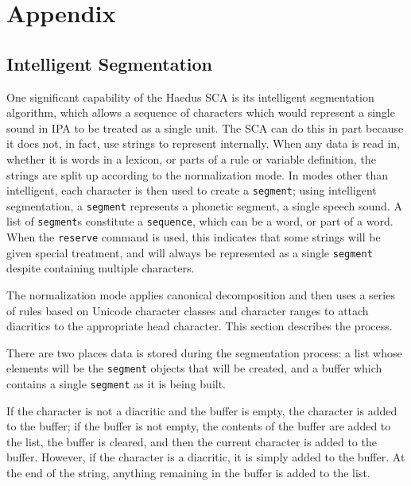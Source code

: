 \documentclass[10pt,letterpaper]{article}
\begin{document}

\section{Appendix}
\label{sec:appendix}

\subsection{Intelligent Segmentation}
\label{sub:segmentation}
One significant capability of the Haedus SCA is its intelligent segmentation algorithm, which allows a sequence of characters which would represent a single sound in IPA to be treated as a single unit. The SCA can do this in part because it does not, in fact, use strings to represent internally. When any data is read in, whether it is words in a lexicon, or parts of a rule or variable definition, the strings are split up according to the normalization mode. In modes other than intelligent, each character is then used to create a \texttt{segment}; using intelligent segmentation, a \texttt{segment} represents a phonetic segment, a single speech sound. A list of \texttt{segment}s constitute a \texttt{sequence}, which can be a word, or part of a word. When the \texttt{reserve} command is used, this indicates that some strings will be given special treatment, and will always be represented as a single \texttt{segment} despite containing multiple characters.

The normalization mode applies canonical decomposition and then uses a series of rules based on Unicode character classes and character ranges to attach diacritics to the appropriate head character. This section describes the process.

There are two places data is stored during the segmentation process: a list whose elements will be the \texttt{segment} objects that will be created, and a buffer which contains a single \texttt{segment} as it is being built.

If the character is not a diacritic and the buffer is empty, the character is added to the buffer; if the buffer is not empty, the contents of the buffer are added to the list, the buffer is cleared, and then the current character is added to the buffer. However, if the character is a diacritic, it is simply added to the buffer. At the end of the string, anything remaining in the buffer is added to the list.
\end{document}
